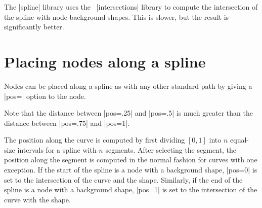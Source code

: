 \documentclass[a4paper]{ltxdoc}
\begin{document}
The |spline| library uses the \pgfname\ |intersections| library to compute the
intersection of the spline with node background shapes. This is slower, but
the result is significantly better.

\begin{codeexample}[]
\end{codeexample}

\section{Placing nodes along a spline}
Nodes can be placed along a spline as with any other standard path by giving a
|pos=| option to the node.
\begin{codeexample}[]
\end{codeexample}
Note that the distance between |pos=.25| and |pos=.5| is much greater than the
distance between |pos=.75| and |pos=1|.

The position along the curve is computed by first dividing $[0,1]$ into $n$
equal-size intervals for a spline with $n$ segments. After selecting the
segment, the position along the segment is computed in the normal fashion for
curves with one exception. If the start of the spline is a node with a
background shape, |pos=0| is set to the intersection of the curve and the
shape. Similarly, if the end of the spline is a node with a background shape,
|pos=1| is set to the intersection of the curve with the shape.
\end{document}

